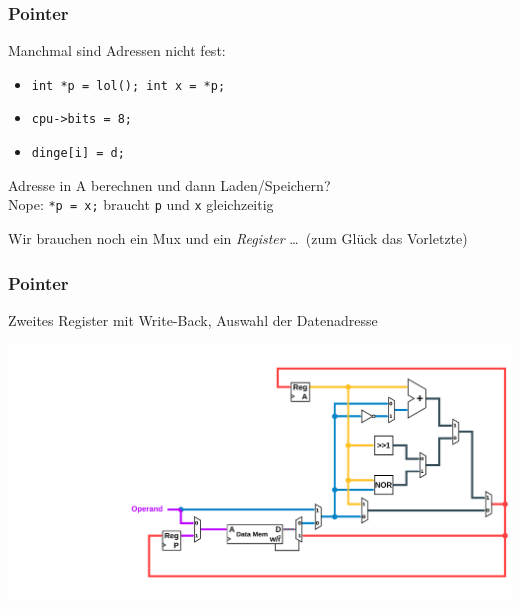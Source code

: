 \documentclass[t,aspectratio=169]{beamer}
\begin{document}
\begin{frame}
  \frametitle{Pointer}

  Manchmal sind Adressen nicht fest:
  \begin{itemize}
  \item \texttt{int *p = lol(); int x = *p;}
  \item \texttt{cpu->bits = 8;}
  \item \texttt{dinge[i] = d;}
  \end{itemize}

  \bigskip

  Adresse in A berechnen und dann Laden/Speichern?\\
  Nope: \texttt{*p = x;} braucht \texttt{p} und \texttt{x} gleichzeitig

  \bigskip
  \pause

  Wir brauchen noch ein Mux und ein \emph{Register} \ldots\ (zum Glück das Vorletzte)

\end{frame}

\begin{frame}
  \frametitle{Pointer}

  \strut{}Zweites Register mit Write-Back, Auswahl der Datenadresse

  \begin{center}
    \includegraphics[width=.85\textwidth]{sch-pointer.pdf}
  \end{center}
\end{frame}
\end{document}
